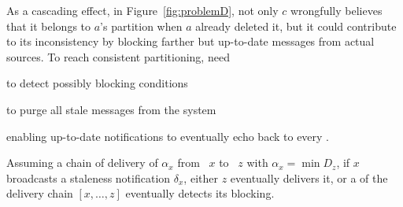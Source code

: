 As a cascading effect, in Figure~\ref{fig:problemD}, not only $c$
wrongfully believes that it belongs to $a$'s partition when $a$
already deleted it, but it could contribute to its inconsistency by
blocking farther but up-to-date messages from actual sources. To reach
consistent partitioning, \processes need
\begin{inparaenum}[(i)]
\item to detect possibly blocking conditions 
\item to purge all stale messages from the system
\item enabling up-to-date notifications to eventually echo back to
  every \process.
\end{inparaenum}

\begin{lemma}
  Assuming a chain of delivery of $\alpha_x$ from \Process~$x$ to
  \Process~$z$ with $\alpha_x = \min D_z$, if $x$ broadcasts a
  staleness notification $\delta_x$, either $z$ eventually delivers
  it, or a \process of the delivery chain $[x,\ldots, z]$ eventually
  detects its blocking.
\end{lemma}


